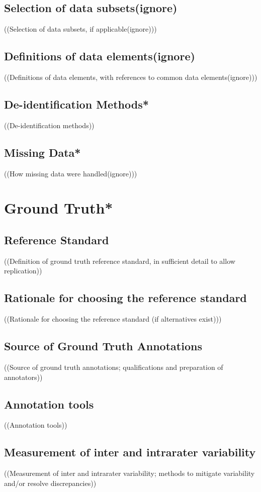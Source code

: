 \subsection{Selection of data subsets(ignore)}
((Selection of data subsets, if applicable(ignore)))
\subsection{Definitions of data elements(ignore)}
((Definitions of data elements, with references to common data elements(ignore)))
\subsection{De-identification Methods*}
((De-identification methods))
\subsection{Missing Data*}
((How missing data were handled(ignore)))



\section{Ground Truth*}
\subsection{Reference Standard}
((Definition of ground truth reference standard, in sufficient detail to allow replication))
\subsection{Rationale for choosing the reference standard}
((Rationale for choosing the reference standard (if alternatives exist))) \\
\subsection{Source of Ground Truth Annotations}
((Source of ground truth annotations; qualifications and preparation of annotators)) \\
\subsection{Annotation tools}
((Annotation tools)) \\
\subsection{Measurement of inter and intrarater variability}
((Measurement of inter and intrarater variability; methods to mitigate variability and/or resolve discrepancies)) \\




